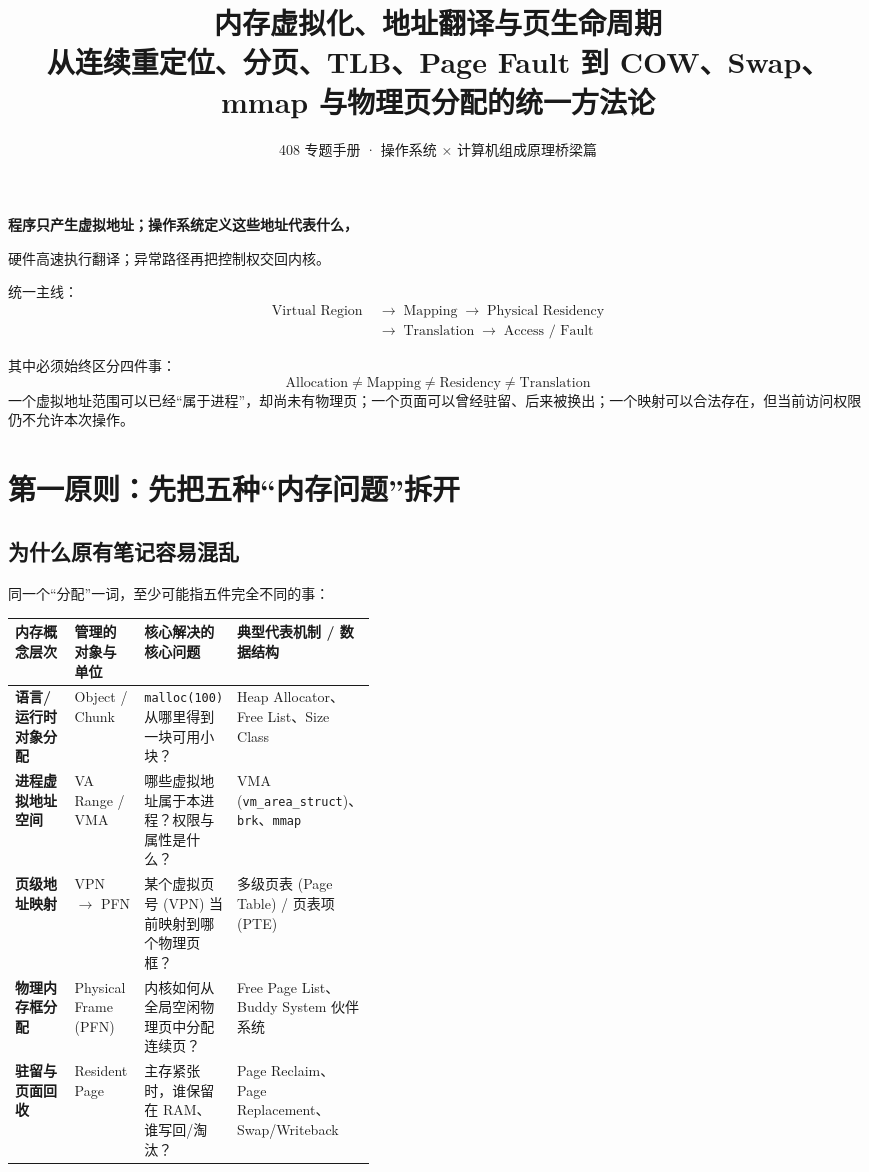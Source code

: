 \documentclass[11pt,a4paper]{ctexart}
\title{\vspace{-1.2cm}\textbf{内存虚拟化、地址翻译与页生命周期}\\[0.35em]
\large 从连续重定位、分页、TLB、Page Fault 到 COW、Swap、mmap 与物理页分配的统一方法论}
\author{408 专题手册 · 操作系统 × 计算机组成原理桥梁篇}
\date{}
\newcommand{\code}[1]{\texttt{#1}}
\newcommand{\arr}{\;\longrightarrow\;}
\begin{document}
\maketitle

\begin{corebox}
\begin{center}
\Large\bfseries 程序只产生虚拟地址；操作系统定义这些地址代表什么，\par
硬件高速执行翻译；异常路径再把控制权交回内核。
\end{center}

统一主线：
\[
\boxed{
\begin{aligned}
\text{Virtual Region} &\arr \text{Mapping} \arr \text{Physical Residency} \\
&\arr \text{Translation} \arr \text{Access / Fault}
\end{aligned}
}
\]

其中必须始终区分四件事：
\[
\boxed{
\text{Allocation}
\neq
\text{Mapping}
\neq
\text{Residency}
\neq
\text{Translation}
}
\]
一个虚拟地址范围可以已经“属于进程”，却尚未有物理页；一个页面可以曾经驻留、后来被换出；一个映射可以合法存在，但当前访问权限仍不允许本次操作。
\end{corebox}

\tableofcontents
\newpage

\section{第一原则：先把五种“内存问题”拆开}

\subsection{为什么原有笔记容易混乱}
同一个“分配”一词，至少可能指五件完全不同的事：

\begin{center}
\begingroup
\small
\renewcommand{\arraystretch}{1.25}
\setlength{\tabcolsep}{6pt}
\begin{tabularx}{\linewidth}{>{\bfseries}p{0.22\linewidth} p{0.2\linewidth} X X}
\toprule
内存概念层次 & 管理的对象与单位 & 核心解决的核心问题 & 典型代表机制 / 数据结构\\
\midrule
语言/运行时对象分配 & Object / Chunk & \code{malloc(100)} 从哪里得到一块可用小块？ & Heap Allocator、Free List、Size Class\\
进程虚拟地址空间 & VA Range / VMA & 哪些虚拟地址属于本进程？权限与属性是什么？ & VMA (\code{vm\_area\_struct})、\code{brk}、\code{mmap}\\
页级地址映射 & VPN $\rightarrow$ PFN & 某个虚拟页号 (VPN) 当前映射到哪个物理页框？ & 多级页表 (Page Table) / 页表项 (PTE)\\
物理内存框分配 & Physical Frame (PFN) & 内核如何从全局空闲物理页中分配连续页？ & Free Page List、Buddy System 伙伴系统\\
驻留与页面回收 & Resident Page & 主存紧张时，谁保留在 RAM、谁写回/淘汰？ & Page Reclaim、Page Replacement、Swap/Writeback\\
\bottomrule
\end{tabularx}
\endgroup
\end{center}
\end{document}
